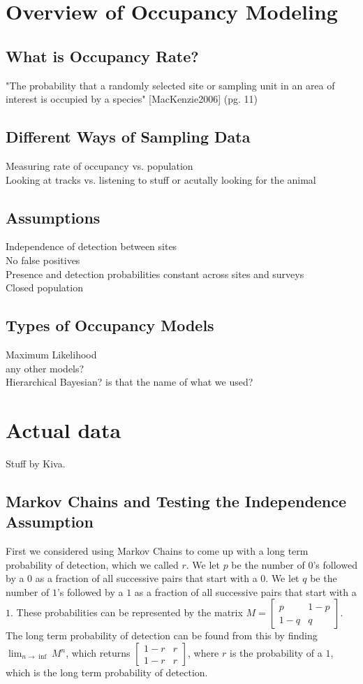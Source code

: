 \documentclass{article}
\begin{document}
\section{Overview of Occupancy Modeling}
	\subsection{What is Occupancy Rate?}
		"The probability that a randomly selected site or sampling unit in an area 
			of interest is occupied by a species" [MacKenzie2006] (pg. 11)
	\subsection{Different Ways of Sampling Data}
		Measuring rate of occupancy vs. population \\
		Looking at tracks vs. listening to stuff or acutally looking for the animal
	\subsection{Assumptions}
		Independence of detection between sites \\
		No false positives \\
		Presence and detection probabilities constant across sites and surveys \\
		Closed population
	\subsection{Types of Occupancy Models}
		Maximum Likelihood \\
		any other models? \\
		Hierarchical Bayesian?  is that the name of what we used?

\section{Actual data}
Stuff by Kiva.
	\subsection{Markov Chains and Testing the Independence Assumption}

		First we considered using Markov Chains to come up with a long term 
probability of detection, which we called \(r\).  We let \(p\) be the number of 
\(0\)'s followed by a \(0\) as a fraction of all successive pairs that start with 
a \(0\).  We let \(q\) be the number of \(1\)'s followed by a \(1\) as a fraction 
of all successive pairs that start with a \(1\).  These probabilities can be
represented by the matrix \(M = \begin{bmatrix} p & 1-p \\ 1-q & q \end{bmatrix}\).
The long term probability of detection can be found from this by finding 
\(\lim_{n \to \inf} M^n\), which returns \( \begin{bmatrix} 1-r & r \\ 1-r & r 
\end{bmatrix}\), where \(r\) is the probability of a \(1\), which is the long term 
probability of detection.  
\end{document}
